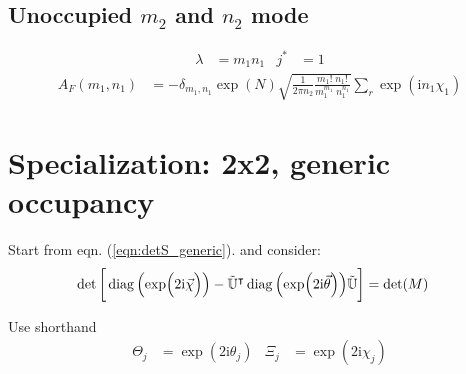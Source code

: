\documentclass[
	english,
	a4paper,
	fontsize=10pt,
	parskip=half,
	titlepage=true,
	DIV=12,
	final
]{scrreprt}
\newcommand*{\transp}{\ensuremath{^\intercal}}
\newcommand*{\iunit}{\ensuremath{\mathrm{i}}}
\DeclareMathOperator{\diag}{diag}
\begin{document}
\subsection{Unoccupied $m_2$ and $n_2$ mode}
\begin{align}
	\lambda &= m_1 n_1
&
	j^* &= 1
\end{align}
\begin{align}
	A_F(m_1, n_1)
&=
	-\delta_{m_1,n_1}
	\exp(N)
	\sqrt{
		\frac
			{1}
			{2\pi n_2}
		\frac
			{ m_1!      \; n_1! }
			{ m_1^{m_1} \; n_1^{n_1} }
	}
	\sum_r
		\exp( \iunit n_1 \chi_1 )
\end{align}

\section{Specialization: 2x2, generic occupancy}
Start from eqn. (\ref{eqn:detS_generic}). and consider:
\begin{align*}
	\det\qty[\bigg.
		\diag\qty(\exp(\Big.2\iunit\vec{\chi}))
		-
		\tilde{\mathbb{U}}\transp
		\diag\qty(\exp(2\iunit\vec{\theta}))
		\tilde{\mathbb{U}}
	]
&=
	\det(M)
\end{align*}

Use shorthand
\begin{align}
	\Theta_j &= \exp(2\iunit \theta_j)
&
	\Xi_j &= \exp(2\iunit \chi_j)
\end{align}
\end{document}
